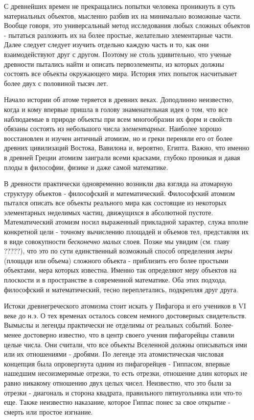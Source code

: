 С древнейших времен не прекращались попытки человека проникнуть в суть материальных объектов, мысленно разбив их на минимально возможные части.
Вообще говоря, это универсальный метод исследования любых сложных объектов - пытаться разложить их на более простые, желательно элементарные части. 
Далее следует следует изучить отдельно каждую часть и то, как они взаимодействуют друг с другом.
Поэтому не столь удивительно, что ученые древности пытались найти и описать первоэлементы, из которых должны состоять все объекты окружающего мира.
История этих попыток насчитывает более двух с половиной тысяч лет.

Начало истории об атоме теряется в древних веках.
Доподлинно неизвестно, когда и кому впервые пришла в голову знаменательная идея о том, что все наблюдаемые в природе объекты при всем многообразии их форм и свойств обязаны состоять из небольшого числа \textit{элементарных}.
Наиболее хорошо восстановлен и изучен античный атомизм, но и греки переняли его от более древних цивилизаций Востока, Вавилона и, вероятно, Египта.
Важно, что именно в древней Греции атомизм заиграли всеми красками, глубоко проникая и давая плоды в философии, физике и даже самой математике.

В древности практически одновременно возникли два взгляда на атомарную структуру объектов - философский и математический.
Философский атомизм пытался описать все объекты реального мира как состоящие из некоторых элементарных неделимых частиц, движущихся в абсолютной пустоте.
Математический атомизм носил выраженный прикладной характер, служа вполне конкретной цели - точному вычислению площадей и объемов тел, представляя их в виде совокупности \textit{бесконечно малых} слоев.
Позже мы увидим (см. главу ?????), что это по сути единственный возможный способ определения \textit{меры} (площади или объема) сложного объекта - приблизить его более простыми объектами, мера которых известна.
Именно так определяют меру объектов на плоскости и в пространстве в современной математике.
Оба этих подхода, философский и математический, тесно переплетались, подкрепляя друг друга.

Истоки древнегреческого атомизма стоит искать у Пифагора и его учеников в VI веке до н.э. 
О тех временах осталось совсем немного достоверных свидетельств.
Вымыслы и легенды практически не отделимы от реальных событий.
Более-менее достоверно известно, что в центр своего учения пифагорейцы ставили целые числа.
Они считали, что все объекты Вселенной должны описываться ими или их отношениями - дробями.
По легенде эта атомистическая числовая концепция была опровергнута одним из пифагорейцев - Гиппасом, впервые нашедшим несоизмеримые отрезки, то есть отрезки, отношение длин которых не равно никакому отношению двух целых чисел.
Неизвестно, что это были за отрезки - диагональ и сторона квадрата, правильного пятиугольника или что-то еще.
Также неизвестно наказание, которое Гиппас понес за свое открытие - смерть или простое изгнание.   

